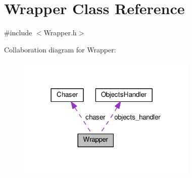 \hypertarget{class_wrapper}{}\section{Wrapper Class Reference}
\label{class_wrapper}


{\ttfamily \#include $<$Wrapper.\+h$>$}



Collaboration diagram for Wrapper\+:
\nopagebreak
\begin{figure}[H]
\begin{center}
\leavevmode
\includegraphics[width=243pt]{class_wrapper__coll__graph}
\end{center}
\end{figure}
